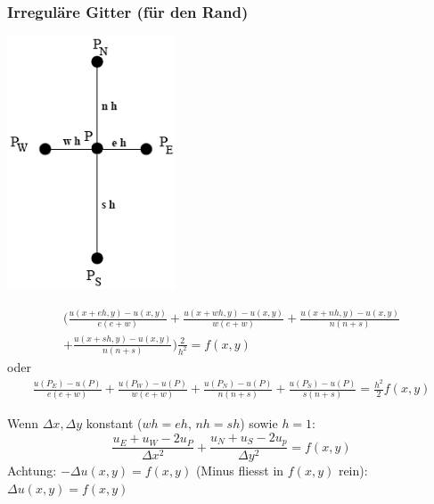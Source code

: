 \subsubsection{Irreguläre Gitter (für den Rand)}
\begin{minipage}{5cm}
	\includegraphics[width=5cm]{Content/Numerik/irregulaereGitter.png}

\end{minipage}
\hfill
\begin{minipage}{14cm}

\begin{multline*}
\bigg(\frac{u(x+eh,y)-u(x,y)}{e(e+w)} +\frac{u(x+wh,y)-u(x,y)}{w(e+w)}+\frac{u(x+nh,y)-u(x,y)}{n(n+s)}\\ +\frac{u(x+sh,y)-u(x,y)}{n(n+s)}\bigg)\frac{2}{h^2}
=f(x,y)
\end{multline*}
oder
\begin{multline*}\frac{u(P_E) - u(P)}{e(e+w)} + \frac{u(P_W) - u(P)}{w(e+w)} + \frac{u(P_N) - u(P)}{n(n+s)} + \frac{u(P_S) - u(P)}{s(n+s)} = \frac{h^2}{2} f(x,y)
\end{multline*}

Wenn $\Delta x, \Delta y$ konstant ($wh = eh,\, nh = sh$) sowie $h=1$:
$$
\frac{u_E + u_W - 2 u_P}{\Delta x^2} + \frac{u_N + u_S - 2 u_p}{\Delta y^2} = f(x,y)
$$
Achtung: $-\Delta u(x,y)= f(x,y) $ (Minus fliesst in $f(x,y)$ rein): $\Delta
u(x,y) = f(x,y)$\\

\end{minipage}

